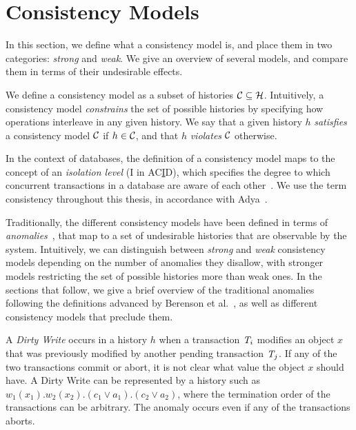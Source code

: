 \section{Consistency Models}

In this section, we define what a consistency model is, and place them in two categories: \emph{strong} and \emph{weak}. We give an overview of several models, and compare them in terms of their undesirable effects.

We define a consistency model as a subset of histories $\mathcal{C} \subseteq \mathcal{H}$. Intuitively, a consistency model \emph{constrains} the set of possible histories by specifying how operations interleave in any given history. We say that a given history $h$ \emph{satisfies} a consistency model $\mathcal{C}$ if $h \in \mathcal{C}$, and that $h$ \emph{violates} $\mathcal{C}$ otherwise.

In the context of databases, the definition of a consistency model maps to the concept of an \emph{isolation level} (I in AC\underline{I}D), which specifies the degree to which concurrent transactions in a database are aware of each other~\citep{adya_thesis}. We use the term consistency throughout this thesis, in accordance with Adya~\citep{adya_thesis}.

Traditionally, the different consistency models have been defined in terms of \emph{anomalies}~\citep{sql-critique}, that map to a set of undesirable histories that are observable by the system. Intuitively, we can distinguish between \emph{strong} and \emph{weak} consistency models depending on the number of anomalies they disallow, with stronger models restricting the set of possible histories more than weak ones. In the sections that follow, we give a brief overview of the traditional anomalies following the definitions advanced by Berenson et al.~\citep{sql-critique}, as well as different consistency models that preclude them.

\begin{definition}
A \emph{Dirty Write} occurs in a history $h$ when a transaction $\mathit{T}_i$ modifies an object $x$ that was previously modified by another pending transaction $\mathit{T}_j$. If any of the two transactions commit or abort, it is not clear what value the object $x$ should have. A Dirty Write can be represented by a history such as $w_1(x_1).w_2(x_2).(c_1 \vee a_1).(c_2 \vee a_2)$, where the termination order of the transactions can be arbitrary. The anomaly occurs even if any of the transactions aborts.
\end{definition}

